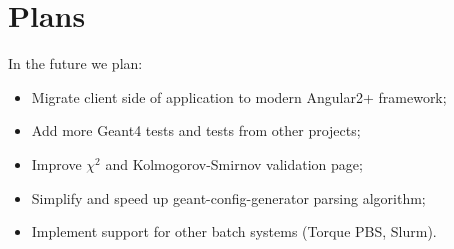 \section{Plans}
\label{sec-plans}

In the future we plan:
\begin{itemize}
	\item Migrate client side of application to modern Angular2+ framework;
	\item Add more Geant4 tests and tests from other projects;
	\item Improve $\chi^2$ and Kolmogorov-Smirnov validation page;
	\item Simplify and speed up geant-config-generator parsing algorithm;
	\item Implement support for other batch systems (Torque PBS, Slurm).
\end{itemize}
